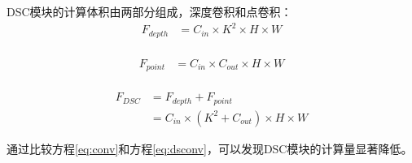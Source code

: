 DSC模块的计算体积由两部分组成，深度卷积和点卷积：
\begin{equation}
\begin{aligned}
    F_{depth} &= {C_{in}}\times{K^2}\times{H}\times{W} \\
\end{aligned} 
\label{eq:dsconv_depth}
\end{equation}

\begin{equation}
\begin{aligned}
    F_{point} &= {C_{in}}\times{C_{out}}\times{H}\times{W} \\
\end{aligned} 
\label{eq:dsconv_point}
\end{equation}

\begin{equation}
\begin{aligned}
    F_{DSC} &= F_{depth} + F_{point} \\
            &= {C_{in}}\times\left({K^2+C_{out}}\right)\times{H}\times{W}
\end{aligned} 
\label{eq:dsconv}
\end{equation}

通过比较方程\ref{eq:conv}和方程\ref{eq:dsconv}，可以发现DSC模块的计算量显著降低。

\begin{figure}[htbp]
    \centering
    \captionsetup{font=footnotesize}
    \label{fig:nnConv}
\end{figure}

\begin{figure}[htbp]
    \centering
    \captionsetup{font=footnotesize}
    \label{fig:DSC}
\end{figure}

